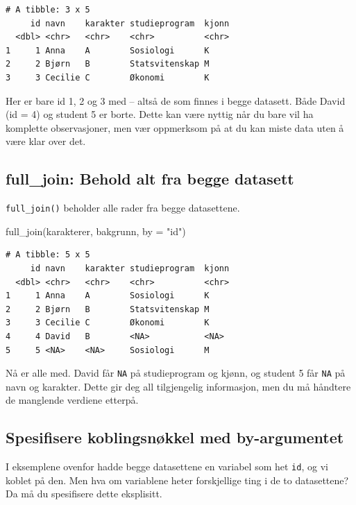 \documentclass[
  norsk,
  letterpaper,
  DIV=11,
  numbers=noendperiod]{scrreprt}
\newenvironment{Shaded}{\begin{snugshade}}{\end{snugshade}}
\newcommand{\AttributeTok}[1]{\textcolor[rgb]{0.40,0.45,0.13}{#1}}
\newcommand{\FunctionTok}[1]{\textcolor[rgb]{0.28,0.35,0.67}{#1}}
\newcommand{\NormalTok}[1]{\textcolor[rgb]{0.00,0.23,0.31}{#1}}
\newcommand{\StringTok}[1]{\textcolor[rgb]{0.13,0.47,0.30}{#1}}
\theoremstyle{definition}
\theoremstyle{remark}
\begin{document}
\begin{verbatim}
# A tibble: 3 x 5
     id navn    karakter studieprogram  kjonn
  <dbl> <chr>   <chr>    <chr>          <chr>
1     1 Anna    A        Sosiologi      K    
2     2 Bjørn   B        Statsvitenskap M    
3     3 Cecilie C        Økonomi        K    
\end{verbatim}

Her er bare id 1, 2 og 3 med -- altså de som finnes i begge datasett.
Både David (id = 4) og student 5 er borte. Dette kan være nyttig når du
bare vil ha komplette observasjoner, men vær oppmerksom på at du kan
miste data uten å være klar over det.

\subsection{full\_join: Behold alt fra begge
datasett}\label{full_join-behold-alt-fra-begge-datasett}

\texttt{full\_join()} beholder alle rader fra begge datasettene.

\begin{Shaded}
\begin{Highlighting}[]
\FunctionTok{full\_join}\NormalTok{(karakterer, bakgrunn, }\AttributeTok{by =} \StringTok{"id"}\NormalTok{)}
\end{Highlighting}
\end{Shaded}

\begin{verbatim}
# A tibble: 5 x 5
     id navn    karakter studieprogram  kjonn
  <dbl> <chr>   <chr>    <chr>          <chr>
1     1 Anna    A        Sosiologi      K    
2     2 Bjørn   B        Statsvitenskap M    
3     3 Cecilie C        Økonomi        K    
4     4 David   B        <NA>           <NA> 
5     5 <NA>    <NA>     Sosiologi      M    
\end{verbatim}

Nå er alle med. David får \texttt{NA} på studieprogram og kjønn, og
student 5 får \texttt{NA} på navn og karakter. Dette gir deg all
tilgjengelig informasjon, men du må håndtere de manglende verdiene
etterpå.

\subsection{Spesifisere koblingsnøkkel med
by-argumentet}\label{spesifisere-koblingsnuxf8kkel-med-by-argumentet}

I eksemplene ovenfor hadde begge datasettene en variabel som het
\texttt{id}, og vi koblet på den. Men hva om variablene heter
forskjellige ting i de to datasettene? Da må du spesifisere dette
eksplisitt.
\end{document}
